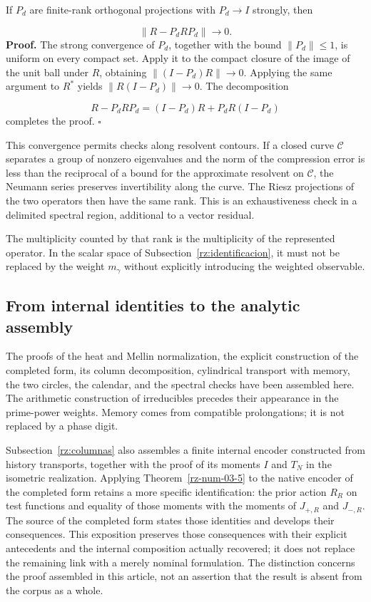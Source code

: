 If \(P_d\) are finite-rank orthogonal projections with \(P_d\to I\) strongly, then

\[
\|R-P_dRP_d\|\longrightarrow0.
\]
\textbf{Proof.} The strong convergence of \(P_d\), together with the bound \(\|P_d\|\leq1\), is uniform on every compact set. Apply it to the compact closure of the image of the unit ball under \(R\), obtaining \(\|(I-P_d)R\|\to0\). Applying the same argument to \(R^*\) yields \(\|R(I-P_d)\|\to0\). The decomposition

\[
R-P_dRP_d=(I-P_d)R+P_dR(I-P_d)
\]
completes the proof. \hfill\(\square\)

This convergence permits checks along resolvent contours. If a closed curve \(\mathcal C\) separates a group of nonzero eigenvalues and the norm of the compression error is less than the reciprocal of a bound for the approximate resolvent on \(\mathcal C\), the Neumann series preserves invertibility along the curve. The Riesz projections of the two operators then have the same rank. This is an exhaustiveness check in a delimited spectral region, additional to a vector residual.

The multiplicity counted by that rank is the multiplicity of the represented operator. In the scalar space of Subsection~\ref{rz:identificacion}, it must not be replaced by the weight \(m_\gamma\) without explicitly introducing the weighted observable.

\subsection{From internal identities to the analytic assembly}
\label{rz:alcance}
The proofs of the heat and Mellin normalization, the explicit construction of the completed form, its column decomposition, cylindrical transport with memory, the two circles, the calendar, and the spectral checks have been assembled here. The arithmetic construction of irreducibles precedes their appearance in the prime-power weights. Memory comes from compatible prolongations; it is not replaced by a phase digit.

Subsection~\ref{rz:columnas} also assembles a finite internal encoder constructed from history transports, together with the proof of its moments \(I\) and \(T_N\) in the isometric realization. Applying Theorem~\ref{rz-num-03-5} to the native encoder of the completed form retains a more specific identification: the prior action \(R_R\) on test functions and equality of those moments with the moments of \(J_{+,R}\) and \(J_{-,R}\). The source of the completed form states those identities and develops their consequences. This exposition preserves those consequences with their explicit antecedents and the internal composition actually recovered; it does not replace the remaining link with a merely nominal formulation. The distinction concerns the proof assembled in this article, not an assertion that the result is absent from the corpus as a whole.


